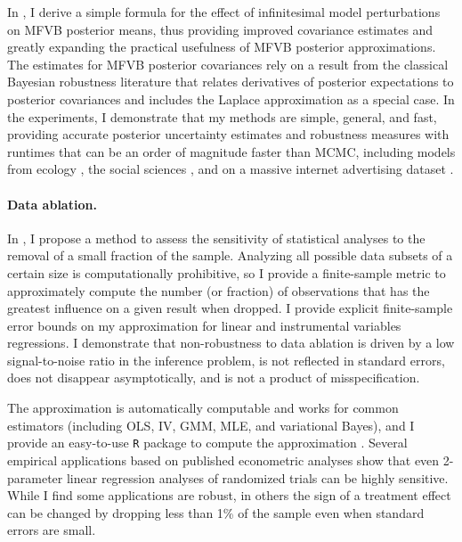 In \citet{giordano:2015:linear, giordano:2018:covariances}, I derive a simple
formula for the effect of infinitesimal model perturbations on MFVB posterior
means, thus providing improved covariance estimates and greatly expanding the
practical usefulness of MFVB posterior approximations. The estimates for MFVB
posterior covariances rely on a result from the classical Bayesian robustness
literature that relates derivatives of posterior expectations to posterior
covariances and includes the Laplace approximation as a special case.
In the experiments, I demonstrate that my methods are simple, general, and
fast, providing accurate posterior uncertainty estimates and robustness measures
with runtimes that can be an order of magnitude faster than MCMC, including
models from ecology \citep{kery:2011:bayesian}, the social sciences
\citep{gelman:2006:arm}, and on a massive internet advertising dataset
\citep{criteo:2014:dataset}.



\paragraph{Data ablation.}

In \citet{giordano:2020:amip}, I propose a method to assess the sensitivity of
statistical analyses to the removal of a small fraction of the sample. Analyzing
all possible data subsets of a certain size is computationally prohibitive, so I
provide a finite-sample metric to approximately compute the number (or fraction)
of observations that has the greatest influence on a given result when dropped.
I provide explicit finite-sample error bounds on my approximation for linear
and instrumental variables regressions.
I demonstrate
that non-robustness to data ablation is driven by a low signal-to-noise ratio in
the inference problem, is not reflected in standard errors, does not disappear
asymptotically, and is not a product of misspecification.

The approximation is automatically computable and works for common estimators
(including OLS, IV, GMM, MLE, and variational Bayes), and I provide an
easy-to-use \texttt{R} package to compute the approximation
\citep{zaminfluence}. Several empirical applications based on published
econometric analyses \citep{angelucci:2009:indirect, finkelstein:2012:oregon,
meager:2019:microcredit} show that even 2-parameter linear regression analyses
of randomized trials can be highly sensitive. While I find some applications are
robust, in others the sign of a treatment effect can be changed by dropping less
than 1\% of the sample even when standard errors are small.


